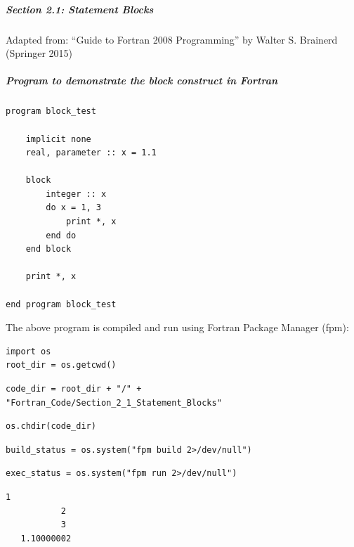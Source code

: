 \subparagraph{Section 2.1: Statement Blocks}

Adapted from: ``Guide to Fortran 2008 Programming'' by Walter S. Brainerd (Springer 2015)

\subparagraph{Program to demonstrate the \textbf{block} construct in Fortran}

\begin{verbatim}
program block_test

    implicit none
    real, parameter :: x = 1.1

    block
        integer :: x
        do x = 1, 3
            print *, x
        end do
    end block

    print *, x

end program block_test
\end{verbatim}

The above program is compiled and run using Fortran Package Manager (fpm):

\begin{verbatim}
import os
root_dir = os.getcwd()
\end{verbatim}

\begin{verbatim}
code_dir = root_dir + "/" + "Fortran_Code/Section_2_1_Statement_Blocks"
\end{verbatim}

\begin{verbatim}
os.chdir(code_dir)
\end{verbatim}

\begin{verbatim}
build_status = os.system("fpm build 2>/dev/null")
\end{verbatim}

\begin{verbatim}
exec_status = os.system("fpm run 2>/dev/null")
\end{verbatim}

\begin{verbatim}
1
           2
           3
   1.10000002
\end{verbatim}